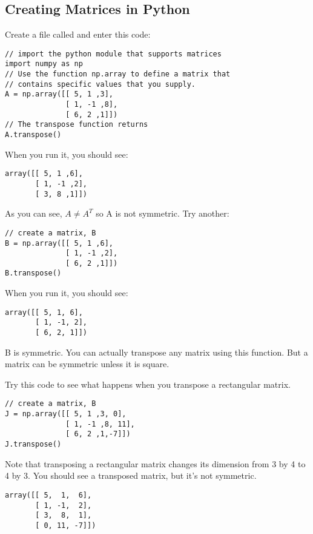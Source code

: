 \subsection{Creating Matrices in Python}
Create a file called  and enter this code:
\begin{Verbatim}
// import the python module that supports matrices
import numpy as np
// Use the function np.array to define a matrix that 
// contains specific values that you supply.
A = np.array([[ 5, 1 ,3], 
              [ 1, -1 ,8], 
              [ 6, 2 ,1]])
// The transpose function returns 
A.transpose()
\end{Verbatim}
When you run it, you should see:
\begin{Verbatim}
array([[ 5, 1 ,6], 
       [ 1, -1 ,2], 
       [ 3, 8 ,1]])
\end{Verbatim}
As you can see, $A\neq A^T$ so A is not symmetric.
Try another: 
\begin{Verbatim}
// create a matrix, B
B = np.array([[ 5, 1 ,6], 
              [ 1, -1 ,2], 
              [ 6, 2 ,1]])
B.transpose()
\end{Verbatim}
When you run it, you should see:
\begin{Verbatim}
array([[ 5, 1, 6], 
       [ 1, -1, 2], 
       [ 6, 2, 1]])
\end{Verbatim}
B is symmetric. You can actually transpose any matrix using this function. But a matrix can be symmetric unless it is square. 

Try this code to see what happens when you transpose a rectangular matrix. 
\begin{Verbatim}
// create a matrix, B
J = np.array([[ 5, 1 ,3, 0], 
              [ 1, -1 ,8, 11], 
              [ 6, 2 ,1,-7]])
J.transpose()
\end{Verbatim}
Note that transposing a rectangular matrix changes its dimension from 3 by 4 to 4 by 3. You should see a transposed matrix, but it's not symmetric.
\begin{Verbatim}
array([[ 5,  1,  6],
       [ 1, -1,  2],
       [ 3,  8,  1],
       [ 0, 11, -7]])
\end{Verbatim}

